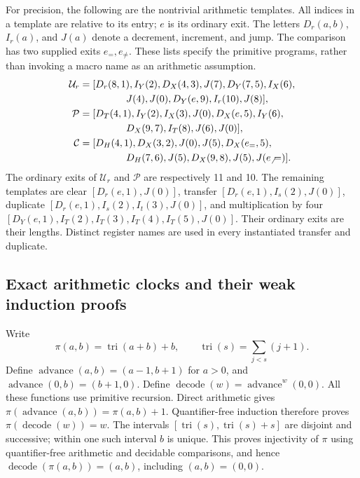 For precision, the following are the nontrivial arithmetic templates.
All indices in a template are relative to its entry; $e$ is its ordinary
exit.  The letters $D_r(a,b)$, $I_r(a)$, and $J(a)$ denote a decrement,
increment, and jump.  The comparison has two supplied exits $e_=,e_\ne$.
These lists specify the primitive programs, rather than invoking a macro
name as an arithmetic assumption.
\begin{align*}
\mathcal U_r={}&[
 D_r(8,1), I_Y(2),D_X(4,3),J(7),D_Y(7,5),I_X(6),\\
 &\hspace{12mm}J(4),J(0),D_Y(e,9),I_r(10),J(8)],\\
\mathcal P={}&[
 D_T(4,1),I_Y(2),I_X(3),J(0),D_X(e,5),I_Y(6),\\
 &\hspace{12mm}D_X(9,7),I_T(8),J(6),J(0)],\\
\mathcal C={}&[
 D_H(4,1),D_X(3,2),J(0),J(5),D_X(e_=,5),\\
 &\hspace{12mm}D_H(7,6),J(5),D_X(9,8),J(5),J(e_\ne)] .
\end{align*}
The ordinary exits of $\mathcal U_r$ and $\mathcal P$ are respectively
11 and 10.  The remaining templates are clear
$[D_r(e,1),J(0)]$, transfer
$[D_r(e,1),I_s(2),J(0)]$, duplicate
$[D_r(e,1),I_s(2),I_t(3),J(0)]$, and multiplication by four
$[D_Y(e,1),I_T(2),I_T(3),I_T(4),I_T(5),J(0)]$.
Their ordinary exits are their lengths.  Distinct register names are used
in every instantiated transfer and duplicate.

\subsection{Exact arithmetic clocks and their weak induction proofs}

Write
\[
 \pi(a,b)=\operatorname{tri}(a+b)+b,\qquad
 \operatorname{tri}(s)=\sum_{j<s}(j+1).
\]
Define $\operatorname{advance}(a,b)=(a-1,b+1)$ for $a>0$, and
$\operatorname{advance}(0,b)=(b+1,0)$.  Define
$\operatorname{decode}(w)=\operatorname{advance}^{w}(0,0)$.
All these functions use primitive recursion.  Direct arithmetic gives
$\pi(\operatorname{advance}(a,b))=\pi(a,b)+1$.  Quantifier-free
induction therefore proves $\pi(\operatorname{decode}(w))=w$.
The intervals $[\operatorname{tri}(s),\operatorname{tri}(s)+s]$ are
disjoint and successive; within one such interval $b$ is unique.
This proves injectivity of $\pi$ using quantifier-free arithmetic and
decidable comparisons, and hence
$\operatorname{decode}(\pi(a,b))=(a,b)$, including $(a,b)=(0,0)$.

